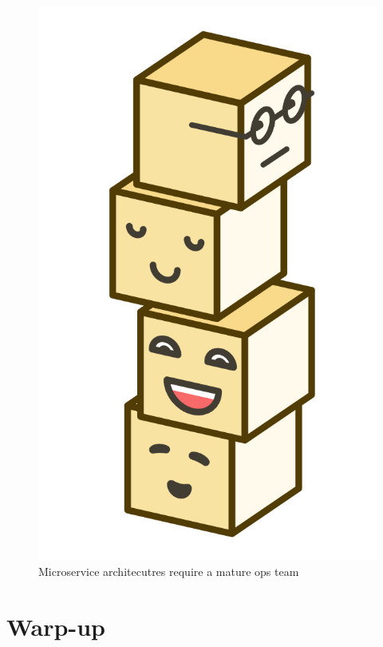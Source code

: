 \begin{figure}[ht]
  \centering
  \includegraphics[width=0.25\linewidth]{assets/illustration-microservice-stack.png}
  \caption{Microservice architecutres require a mature ops team}
\end{figure}


\section{Warp-up}

